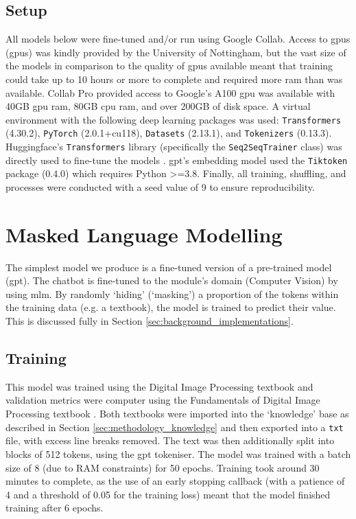 \subsection{Setup} \label{sec:design_setup}
All models below were fine-tuned and/or run using Google Collab. Access to \acrlong{gpu}s (\acrshort{gpu}s) was kindly provided by the University of Nottingham, but the vast size of the models in comparison to the quality of \acrshort{gpu}s available meant that training could take up to 10 hours or more to complete and required more \acrshort{ram} than was available. Collab Pro provided access to Google's A100 \acrshort{gpu} was available with 40GB \acrshort{gpu} \acrshort{ram}, 80GB \acrshort{cpu} \acrshort{ram}, and over 200GB of disk space. A virtual environment with the following deep learning packages was used: \texttt{Transformers} (4.30.2), \texttt{PyTorch} (2.0.1+cu118), \texttt{Datasets} (2.13.1), and \texttt{Tokenizers} (0.13.3). Huggingface's \texttt{Transformers} library (specifically the \texttt{Seq2SeqTrainer} class) was directly used to fine-tune the models \citep{wolf2020huggingfaces}. \acrshort{gpt}'s embedding model used the \texttt{Tiktoken} package (0.4.0) which requires Python >=3.8. Finally, all training, shuffling, and processes were conducted with a seed value of 9 to ensure reproducibility.

\section{Masked Language Modelling}
The simplest model we produce is a fine-tuned version of a pre-trained model (\acrshort{gpt}). The chatbot is fine-tuned to the module's domain (Computer Vision) by using \acrfull{mlm}. By randomly `hiding' (`masking') a proportion of the tokens within the training data (e.g. a textbook), the model is trained to predict their value. This is discussed fully in Section \ref{sec:background_implementations}.

\subsection{Training}
This model was trained using the Digital Image Processing textbook \citep{gonzalez2018digital} and validation metrics were computer using the Fundamentals of Digital Image Processing textbook \citep{solomon2010fundamentals}. Both textbooks were imported into the `knowledge' base as described in Section \ref{sec:methodology_knowledge} and then exported into a \texttt{txt} file, with excess line breaks removed. The text was then additionally split into blocks of 512 tokens, using the \acrshort{gpt} tokeniser. The model was trained with a batch size of 8 (due to RAM constraints) for 50 epochs. Training took around 30 minutes to complete, as the use of an early stopping callback (with a patience of 4 and a threshold of 0.05 for the training loss) meant that the model finished training after 6 epochs. %


